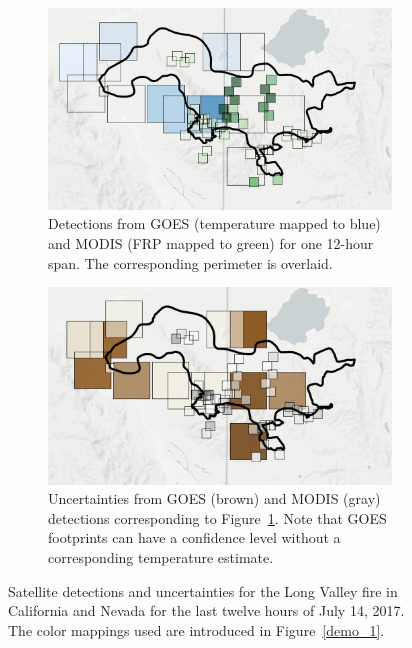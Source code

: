 \begin{figure}[t]
    \begin{subfigure}{0.48\textwidth}
        \centering
        \includegraphics[width=\textwidth]{images/remote_sensing/step_1_example.png}
        \caption{Detections from GOES (temperature mapped to blue) and MODIS (FRP mapped to green) for one 12-hour span. The corresponding perimeter is overlaid.}
        \label{raw_detections}
    \end{subfigure}
    \begin{subfigure}{0.48\textwidth}
        \centering
        \includegraphics[width=\textwidth]{images/remote_sensing/step_1_uncert.png}
        \caption{Uncertainties from GOES (brown) and MODIS (gray) detections corresponding to Figure~\ref{raw_detections}. Note that GOES footprints can have a confidence level without a corresponding temperature estimate.}
        \label{raw_uncertainty}
    \end{subfigure}
     \caption{Satellite detections and uncertainties for the Long Valley fire in California and Nevada for the last twelve hours of July 14, 2017. The color mappings used are introduced in Figure~\ref{demo_1}.}
     \label{assess_detections}
\end{figure}

